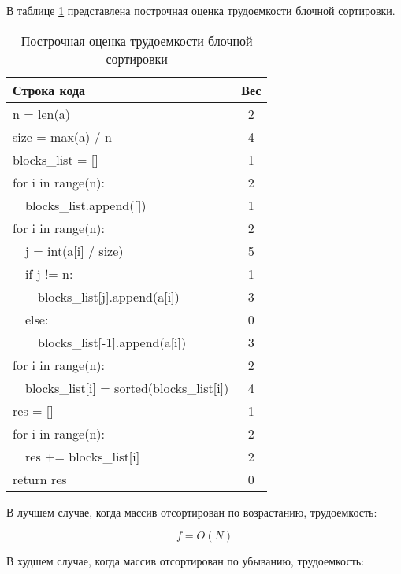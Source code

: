 В таблице \ref{tbl:block_weight} представлена построчная оценка трудоемкости блочной сортировки.
\begin{table}[H]
	\begin{center}
		\begin{threeparttable}
			\captionsetup{}
			\caption{\label{tbl:block_weight}Построчная оценка трудоемкости блочной сортировки}
			\begin{tabular}{|l|c|}
				\hline
				Строка кода & Вес \\
				\hline
				n = len(a) & 2\\
				\hline
				size = max(a) / n & 4\\
				\hline
				blocks\_list = [] & 1\\
				\hline
				for i in range(n): & 2\\
				\hline
				~~blocks\_list.append([]) & 1\\
				\hline
				
				for i in range(n): & 2\\
				\hline
				~~j = int(a[i] / size) & 5\\
				\hline
				~~if j != n: & 1\\
				\hline
				~~~~blocks\_list[j].append(a[i]) & 3\\
				\hline
				~~else: & 0\\
				\hline
				~~~~blocks\_list[-1].append(a[i]) & 3\\
				\hline
				
				for i in range(n): & 2\\
				\hline
				~~blocks\_list[i] = sorted(blocks\_list[i]) & 4\\
				\hline
				
				res = [] & 1\\
				\hline
				for i in range(n): & 2\\
				\hline
				~~res += blocks\_list[i] & 2\\
				\hline
				return res & 0\\
				\hline
			\end{tabular}
		\end{threeparttable}
	\end{center}
\end{table}

В лучшем случае, когда массив отсортирован по возрастанию, трудоемкость:

\begin{equation}
	f = O(N)
\end{equation}

В худшем случае, когда массив отсортирован по убыванию, трудоемкость:

